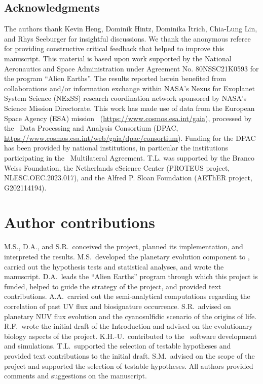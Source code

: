 \begin{acknowledgments}
\section*{Acknowledgments}
    The authors thank Kevin Heng, Dominik Hintz, Dominika Itrich, Chia-Lung Lin, and Rhys Seeburger for insightful discussions.
    We thank the anonymous referee for providing constructive critical feedback that helped to improve this manuscript.
    This material is based upon work supported by the National Aeronautics and Space Administration under Agreement No. 80NSSC21K0593 for the program ``Alien Earths''.
    The results reported herein benefited from collaborations and/or information exchange within NASA’s Nexus for Exoplanet System Science (NExSS) research coordination network sponsored by NASA’s Science Mission Directorate.
    This work has made use of data from the European Space Agency (ESA) mission \gaia\ (\url{https://www.cosmos.esa.int/gaia}), processed by the \gaia\ Data Processing and Analysis Consortium (DPAC, \url{https://www.cosmos.esa.int/web/gaia/dpac/consortium}). Funding for the DPAC has been provided by national institutions, in particular the institutions participating in the \gaia\ Multilateral Agreement.
    T.L. was supported by the Branco Weiss Foundation, the Netherlands eScience Center (PROTEUS project, NLESC.OEC.2023.017), and the Alfred P. Sloan Foundation (AEThER project, G202114194).
\end{acknowledgments}

\section*{Author contributions}
M.S., D.A., and S.R.\ conceived the project, planned its implementation, and interpreted the results.
M.S.\ developed the planetary evolution component to \bioverse, carried out the hypothesis tests and statistical analyses, and wrote the manuscript.
D.A.\ leads the ``Alien Earths'' program through which this project is funded, helped to guide the strategy of the project, and provided text contributions.
A.A.\ carried out the semi-analytical computations regarding the correlation of past UV flux and biosignature occurrence.
S.R.\ advised on planetary \gls{NUV} flux evolution and the cyanosulfidic scenario of the origins of life.
R.F.\ wrote the initial draft of the Introduction and advised on the evolutionary biology aspects of the project.
K.H.-U.\ contributed to the \bioverse\ software development and simulations.
T.L.\ supported the selection of testable hypotheses and provided text contributions to the initial draft.
S.M.\ advised on the scope of the project and supported the selection of testable hypotheses.
All authors provided comments and suggestions on the manuscript.



